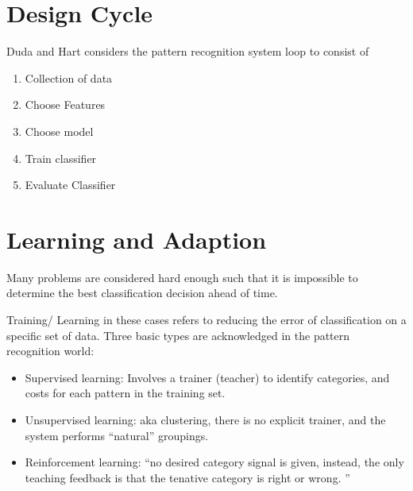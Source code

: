 \section{Design Cycle}

Duda and Hart considers the pattern recognition system loop to consist of
\begin{enumerate}
	\item Collection of data
	\item Choose Features
	\item Choose model 
	\item Train classifier
	\item Evaluate Classifier
\end{enumerate}

\section{Learning and Adaption}

Many problems are considered hard enough such that it is impossible to determine the best classification decision ahead of time.    

Training/ Learning in these cases refers to reducing the error of classification on a specific set of data.    Three basic types are acknowledged in the pattern recognition world:
\begin{itemize}
	\item Supervised learning: Involves a trainer (teacher) to identify categories, and costs for each pattern in the training set.  
	\item Unsupervised learning:  aka clustering, there is no explicit trainer, and the system performs ``natural'' groupings.   
	\item Reinforcement learning:  ``no desired category signal is given, instead, the only teaching feedback is that the tenative category is right or wrong. ''
\end{itemize}

